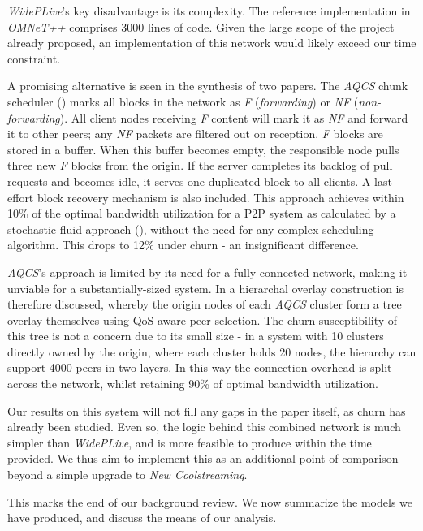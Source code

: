 \documentclass[12pt,a4paper]{article}
\begin{document}
\textit{WidePLive}'s key disadvantage is its complexity. The reference implementation in \textit{OMNeT++} comprises 3000 lines of code. Given the large scope of the project already proposed, an implementation of this network would likely exceed our time constraint.

A promising alternative is seen in the synthesis of two papers. The \textit{AQCS} chunk scheduler (\cite{Guo2008}) marks all blocks in the network as \textit{F} (\textit{forwarding}) or \textit{NF} (\textit{non-forwarding}). All client nodes receiving \textit{F} content will mark it as \textit{NF} and forward it to other peers; any \textit{NF} packets are filtered out on reception. \textit{F} blocks are stored in a buffer. When this buffer becomes empty, the responsible node pulls three new \textit{F} blocks from the origin. If the server completes its backlog of pull requests and becomes idle, it serves one duplicated block to all clients. A last-effort block recovery mechanism is also included. This approach achieves within 10\% of the optimal bandwidth utilization for a P2P system as calculated by a stochastic fluid approach (\cite{Kumar2007}), without the need for any complex scheduling algorithm. This drops to 12\% under churn - an insignificant difference.

\textit{AQCS}'s approach is limited by its need for a fully-connected network, making it unviable for a substantially-sized system. In \cite{Liang2007} a hierarchal overlay construction is therefore discussed, whereby the origin nodes of each \textit{AQCS} cluster form a tree overlay themselves using QoS-aware peer selection. The churn susceptibility of this tree is not a concern due to its small size - in a system with 10 clusters directly owned by the origin, where each cluster holds 20 nodes, the hierarchy can support 4000 peers in two layers. In this way the connection overhead is split across the network, whilst retaining 90\% of optimal bandwidth utilization.

Our results on this system will not fill any gaps in the paper itself, as churn has already been studied. Even so, the logic behind this combined network is much simpler than \textit{WidePLive}, and is more feasible to produce within the time provided. We thus aim to implement this as an additional point of comparison beyond a simple upgrade to \textit{New Coolstreaming}.

This marks the end of our background review. We now summarize the models we have produced, and discuss the means of our analysis.
\end{document}

